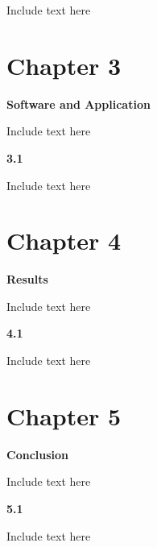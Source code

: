 \documentclass[12pt]{article}
\begin{document}
Include text here

\newpage
\section*{Chapter 3}
\begin{center}
\large \textbf{Software and Application}
\end{center}

Include text here

\vspace{1.5em}
\noindent
\textbf{3.1 }
\vspace{1.5em}

Include text here

\newpage
\section*{Chapter 4}
\begin{center}
\large \textbf{Results}
\end{center}

Include text here

\vspace{1.5em}
\noindent
\textbf{4.1 }
\vspace{1.5em}

Include text here

\newpage
\section*{Chapter 5}
\begin{center}
\large \textbf{Conclusion}
\end{center}

Include text here

\vspace{1.5em}
\noindent
\textbf{5.1 }
\vspace{1.5em}

Include text here

\clearpage
\onehalfspacing
\end{document}
